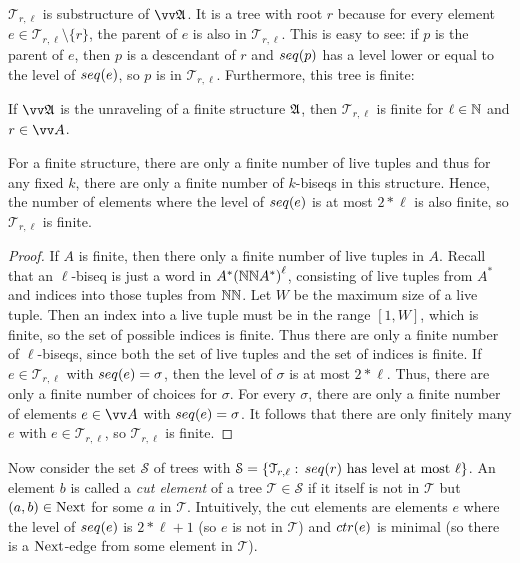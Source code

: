 \noindent
$\mathcal{T}_{r,\ell}$ is substructure of $\unravel{A}$.
It is a tree with root $r$ because for every element $e \in \mathcal{T}_{r,\ell} \setminus \{r\}$, the parent of $e$ is also in $\mathcal{T}_{r,\ell}$.
This is easy to see: if $p$ is the parent of $e$, then $p$ is a descendant of $r$ and $\seq{p}$ has a level lower or equal to the level of $\seq{e}$, so $p$ is in $\mathcal{T}_{r,\ell}$.
Furthermore, this tree is finite:
\begin{lemma}\label{lem:bounded-trees-are-finite}
  If $\unravel{A}$ is the unraveling of a finite structure ${\mathfrak{A}}$, then $\mathcal{T}_{r,\ell}$ is finite for $\ell \in {\mathbb{N}}$ and $r \in \unraveldom{A}$.
\end{lemma}
\begin{proofsketch}
  For a finite structure, there are only a finite number of live tuples and thus for any fixed $k$, there are only a finite number of $k$-biseqs in this structure.
  Hence, the number of elements where the level of $\seq{e}$ is at most $2 * \ell$ is also finite, so $\mathcal{T}_{r,\ell}$ is finite.
\end{proofsketch}
\begin{proof}
If $A$ is finite, then there only a finite number of live tuples in $A$.
Recall that an $\ell$-biseq is just a word in $A^*{({\mathbb{N}}{\mathbb{N}}{}A^{*})}^{\ell}$, consisting of live tuples from $A^{*}$ and indices into those tuples from ${\mathbb{N}}{\mathbb{N}}$.
Let $W$ be the maximum size of a live tuple.
Then an index into a live tuple must be in the range $[1,W]$, which is finite, so the set of possible indices is finite.
Thus there are only a finite number of $\ell$-biseqs, since both the set of live tuples and the set of indices is finite.
If $e \in \mathcal{T}_{r,\ell}$ with $\seq{e} = \sigma$, then the level of $\sigma$ is at most $2 * \ell$.
Thus, there are only a finite number of choices for $\sigma$.
For every $\sigma$, there are only a finite number of elements $e \in \unraveldom{A}$ with $\seq{e} = \sigma$.
It follows that there are only finitely many $e$ with $e \in \mathcal{T}_{r,\ell}$, so $\mathcal{T}_{r,\ell}$ is finite.
\end{proof}
Now consider the set $\mathcal{S}$ of trees with $\mathcal{S} = \left\{ \mathcal{T}_{r,\ell}:\, \seq{r}\ \text{has level at most $\ell$}\right\}$.
An element $b$ is called a \emph{cut element} of a tree $\mathcal{T} \in \mathcal{S}$ if it itself is not in $\mathcal{T}$ but $(a,b) \in \mathrm{Next}$ for some $a$ in $\mathcal{T}$.
Intuitively, the cut elements are elements $e$ where the level of $\seq{e}$ is $2 * \ell + 1$ (so $e$ is not in $\mathcal{T}$) and $\ctr{e}$ is minimal (so there is a $\mathrm{Next}$-edge from some element in $\mathcal{T}$).
